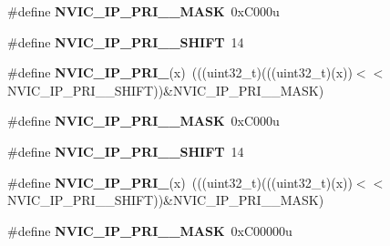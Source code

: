 \begin{DoxyCompactItemize}
\item 
\mbox{\label{group___n_v_i_c___register___masks_gab5fb432f1775a7bf1f198328f66009d3}} 
\#define {\bfseries N\+V\+I\+C\+\_\+\+I\+P\+\_\+\+P\+R\+I\+\_\+\_\+\+M\+A\+SK}~0x\+C000u
\item 
\mbox{\label{group___n_v_i_c___register___masks_ga9ee6ca77dddd98a4fa7e773cdec250fa}} 
\#define {\bfseries N\+V\+I\+C\+\_\+\+I\+P\+\_\+\+P\+R\+I\+\_\+\_\+\+S\+H\+I\+FT}~14
\item 
\mbox{\label{group___n_v_i_c___register___masks_gaafba80f86264d7b1e9a5b1e0fe6d1a24}} 
\#define {\bfseries N\+V\+I\+C\+\_\+\+I\+P\+\_\+\+P\+R\+I\+\_}(x)~(((uint32\+\_\+t)(((uint32\+\_\+t)(x))$<$$<$N\+V\+I\+C\+\_\+\+I\+P\+\_\+\+P\+R\+I\+\_\+\_\+\+S\+H\+I\+FT))\&N\+V\+I\+C\+\_\+\+I\+P\+\_\+\+P\+R\+I\+\_\+\_\+\+M\+A\+SK)
\item 
\mbox{\label{group___n_v_i_c___register___masks_ga480e53d7e2d091174c03809cbbea3b68}} 
\#define {\bfseries N\+V\+I\+C\+\_\+\+I\+P\+\_\+\+P\+R\+I\+\_\+\_\+\+M\+A\+SK}~0x\+C000u
\item 
\mbox{\label{group___n_v_i_c___register___masks_ga14b2c9a7ea14a343605d020edd9f186a}} 
\#define {\bfseries N\+V\+I\+C\+\_\+\+I\+P\+\_\+\+P\+R\+I\+\_\+\_\+\+S\+H\+I\+FT}~14
\item 
\mbox{\label{group___n_v_i_c___register___masks_ga8067ec472d887da2e51f5abdd433d7fb}} 
\#define {\bfseries N\+V\+I\+C\+\_\+\+I\+P\+\_\+\+P\+R\+I\+\_}(x)~(((uint32\+\_\+t)(((uint32\+\_\+t)(x))$<$$<$N\+V\+I\+C\+\_\+\+I\+P\+\_\+\+P\+R\+I\+\_\+\_\+\+S\+H\+I\+FT))\&N\+V\+I\+C\+\_\+\+I\+P\+\_\+\+P\+R\+I\+\_\+\_\+\+M\+A\+SK)
\item 
\mbox{\label{group___n_v_i_c___register___masks_ga020ccac56651e055f659cbcc0387d0b2}} 
\#define {\bfseries N\+V\+I\+C\+\_\+\+I\+P\+\_\+\+P\+R\+I\+\_\+\_\+\+M\+A\+SK}~0x\+C00000u
\item 
\mbox{\label{group___n_v_i_c___register___masks_ga9ecbd3ab4a0623c8001df6917c2764b2}} 

\end{DoxyCompactItemize}
